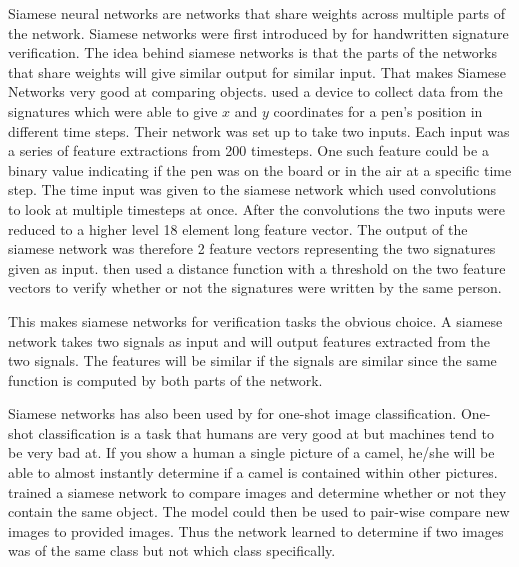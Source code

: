 Siamese neural networks are networks that share weights across multiple parts
of the network. Siamese networks were first introduced by \citet{NIPS1993_769}
for handwritten signature verification. The idea behind siamese networks is
that the parts of the networks that share weights will give similar output for
similar input. That makes Siamese Networks very good at comparing objects.
\citet{NIPS1993_769} used a device to collect data from the signatures which
were able to give $x$ and $y$ coordinates for a pen's position in different time
steps. Their network was set up to take two inputs. Each input was a series
of feature extractions from 200 timesteps. One such feature could be a binary
value indicating if the pen was on the board or in the air at a specific time
step. The time input was given to the siamese network which used convolutions
to look at multiple timesteps at once. After the convolutions the two inputs
were reduced to a higher level 18 element long feature vector. The output of the
siamese network was therefore 2 feature vectors representing the two signatures
given as input. \citet{NIPS1993_769} then used a distance function with a
threshold on the two feature vectors to verify whether or not the signatures
were written by the same person.

This makes siamese networks for verification tasks the obvious choice. A siamese
network takes two signals as input and will output features extracted from the
two signals. The features will be similar if the signals are similar since the
same function is computed by both parts of the network.

Siamese networks has also been used by \citet{Koch2015SiameseNN} for one-shot
image classification. One-shot classification is a task that humans are very
good at but machines tend to be very bad at. If you show a human a single
picture of a camel, he/she will be able to almost instantly determine if a camel
is contained within other pictures. \citet{Koch2015SiameseNN} trained a siamese
network to compare images and determine whether or not they contain the same
object. The model could then be used to pair-wise compare new images to provided
images. Thus the network learned to determine if two images was of the same
class but not which class specifically.

